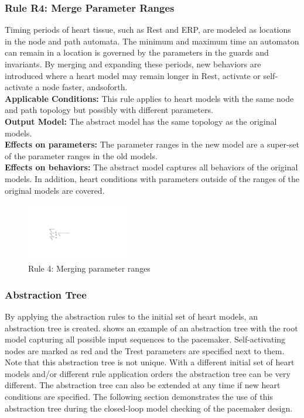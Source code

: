 \subsubsection{Rule R4: Merge Parameter Ranges}
Timing periods of heart tissue, such as Rest and ERP, are modeled as locations in the node and path automata. 
The minimum and maximum time an automaton can remain in a location is governed by the parameters in the guards and invariants. 
By merging and expanding these periods, new behaviors are introduced where a heart model may remain longer in Rest, activate or self-activate a node faster, andsoforth.
\\
\textbf{Applicable Conditions: }
This rule applies to heart models with the same node and path topology but possibly with different parameters.\\
\textbf{Output Model: }The abstract model has the same topology as the original models.\\
\textbf{Effects on parameters:} The parameter ranges in the new model are a super-set of the parameter ranges in the old models.\\
\textbf{Effects on behaviors: }The abstract model captures all behaviors of the original models. In addition, heart conditions with parameters outside of the ranges of the original models are covered.
\begin{figure}[!h]
	\centering
	\includegraphics[width=0.4\textwidth]{figs/rule4.pdf}
	\vspace{-10pt}
	\caption{\small Rule 4: Merging parameter ranges}
	\vspace{-10pt}
	\label{fig:rule4}
\end{figure}

\subsubsection{Abstraction Tree}
By applying the abstraction rules to the initial set of heart models, an abstraction tree is created.
 shows an example of an abstraction tree with the root model capturing all possible input sequences to the pacemaker.
Self-activating nodes are marked as red and the Trest parameters are specified next to them.
Note that this abstraction tree is not unique.
With a different initial set of heart models and/or different rule application orders the abstraction tree can be very different.
The abstraction tree can also be extended at any time if new heart conditions are specified.
The following section demonstrates the use of this abstraction tree during the closed-loop model checking of the pacemaker design.



